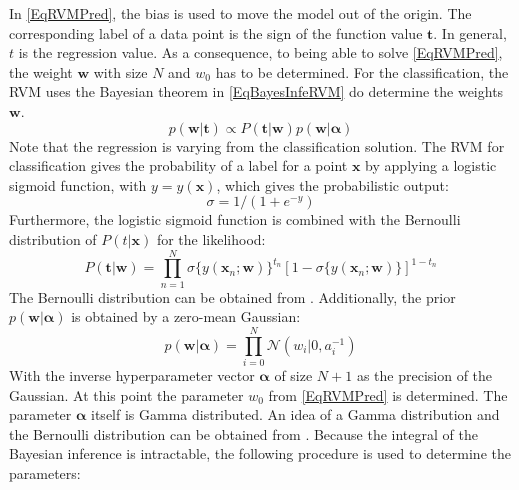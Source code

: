 In \eqref{EqRVMPred}, the bias is used to move the model out of the origin.
The corresponding label of a data point is the sign of the function value $\mathbf{t}$.
In general, $t$ is the regression value. \cite[p. 662]{Theodoridis.2015} \newline
As a consequence, to being able to solve \eqref{EqRVMPred}, the weight $\mathbf{w}$ with size $N$ and $w_0$ has to be determined.
For the classification, the \acs{RVM} uses the Bayesian theorem in \eqref{EqBayesInfeRVM} do determine the weights $\mathbf{w}$. 
\begin{equation}\label{EqBayesInfeRVM}
p( \mathbf{w}\vert \mathbf{t} ) \propto P(\mathbf{t}\vert \mathbf{w}) p(\mathbf{w} \vert \boldsymbol{\alpha})
\end{equation}
Note that the regression is varying from the classification solution.
The \ac{RVM} for classification gives the probability of a label for a point $\mathbf{x}$ by applying a logistic sigmoid function, with $y=y(\mathbf{x})$, which gives the probabilistic output:
\begin{equation}\label{EqLogSig}
\sigma=1/(1+e^{-y}) 
\end{equation}
Furthermore, the logistic sigmoid function is combined with the Bernoulli distribution of $P(t\vert \mathbf{x})$ for the likelihood:
\begin{equation}\label{EqRVMLikelihood}
P(\mathbf{t}\vert\mathbf{w})=\prod_{n=1}^{N}\sigma\{y(\mathbf{x}_n;\mathbf{w})\}^{t_n}[1-\sigma\{y(\mathbf{x}_n;\mathbf{w})\}]^{1-t_n}
\end{equation}
The Bernoulli distribution can be obtained from \cite[p. 685]{Bishop.2009} .
Additionally, the prior $p(\mathbf{w} \vert \boldsymbol{\alpha})$ is obtained by a zero-mean Gaussian:
\begin{equation}\label{EqRVMPrior}
p(\mathbf{w} \vert \boldsymbol{\alpha}) = \prod_{i=0}^{N}\mathcal{N}(w_i\vert 0,a_i^{-1})
\end{equation}
With the inverse hyperparameter vector $\boldsymbol{\alpha}$ of size $N+1$ as the precision of the Gaussian.
At this point the parameter $w_0$ from \eqref{EqRVMPred} is determined.
The parameter $\boldsymbol{\alpha}$ itself is Gamma distributed.\cite[p. 214-215, 218-219]{Tipping.2001}\newline
An idea of a Gamma distribution and the Bernoulli distribution can be obtained from \cite[p.686-688]{Bishop.2009}.\newline
Because the integral of the Bayesian inference is intractable, the following procedure is used to determine the parameters:
